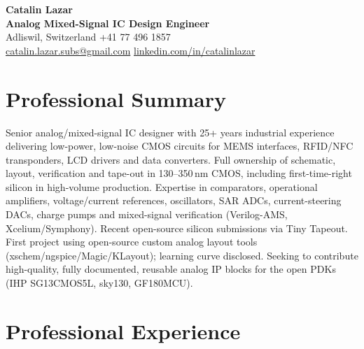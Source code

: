 \documentclass[11pt,a4paper]{article}
\begin{document}
	
	\begin{center}
		{\LARGE \textbf{Catalin Lazar}}\\
		\vspace{4pt}
		\textbf{Analog Mixed-Signal IC Design Engineer} \\
		\vspace{4pt}
		Adliswil, Switzerland  \quad +41 77 496 1857 \\ %
		\href{mailto:catalin.lazar.subs@gmail.com}{catalin.lazar.subs@gmail.com} \quad
		\href{https://www.linkedin.com/in/catalinlazar}{linkedin.com/in/catalinlazar}
	\end{center}
	
	\section*{Professional Summary}
	Senior analog/mixed-signal IC designer with 25+ years industrial experience delivering low-power, low-noise CMOS circuits for MEMS interfaces, RFID/NFC transponders, LCD drivers and data converters. Full ownership of schematic, layout, verification and tape-out in 130--350\,nm CMOS, including first-time-right silicon in high-volume production. Expertise in comparators, operational amplifiers, voltage/current references, oscillators, SAR ADCs, current-steering DACs, charge pumps and mixed-signal verification (Verilog-AMS, Xcelium/Symphony). Recent open-source silicon submissions via Tiny Tapeout. First project using open-source custom analog layout tools (xschem/ngspice/Magic/KLayout); learning curve disclosed. Seeking to contribute high-quality, fully documented, reusable analog IP blocks for the open PDKs (IHP SG13CMOS5L, sky130, GF180MCU).
	
	\section{Professional Experience}
	
\end{document}
